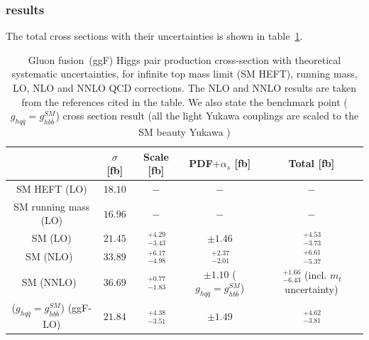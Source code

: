 \subsubsection{results}
The total cross sections with their uncertainties is shown in table~\ref{ggf_xsres}.
%
\begin{table}
	\centering
	\begin{tabular}{ccccc}
		\toprule
		& $ \sigma$	[fb] & Scale [fb] & PDF$+\alpha_s$ [fb]& Total [fb] \\
		\midrule
		SM HEFT  (LO)      &  $ 18.10$    &   $-$      & $-$   &  $-$ \\
		SM   running mass (LO)  &  $ 16.96$    &   $ -$   & $-$   &  $-$ \\
		SM    (LO)  &  $ 21.45$    &   $ \,^{+4.29}_{-3.43}$   & $\pm 1.46$   &  $ \,^{+4.53}_{-3.73}$ \\
		SM   (NLO)~\cite{Baglio:2012np}  &  $ 33.89$   &   $ \,^{+6.17}_{-4.98}$   & $ \,^{+2.37}_{-2.01}$   &  $ \,^{+6.61}_{-5.37}$ \\
		SM   (NNLO)~\cite{Grazzini:2018bsd}  &  $36.69$    &    $ \,^{+0.77}_{-1.83}$   & $\pm 1.10$    ($g_{hq \bar q} = g_{h b \bar b}^{SM}$) &  $ \,^{+1.66}_{-6.43}$ {\tiny(incl. $m_t$ uncertainty)} \\
		($g_{hq \bar q} = g_{h b \bar b}^{SM}$)  (ggF-LO)  &  $ 21.84$    &  $ \,^{+4.38}_{-3.51}$   & $\pm 1.49$   &  $ \,^{+4.62}_{-3.81}$ \\
		\bottomrule
	\end{tabular}
	\label{ggf_xsres}
	\caption{Gluon fusion~(ggF) Higgs pair production cross-section with theoretical systematic uncertainties, for infinite top mass limit (SM HEFT), running mass, LO, NLO and NNLO QCD corrections. The NLO and NNLO results are taken from the references cited in the table. We also state the benchmark point ($g_{hq \bar q} = g_{h b \bar b}^{SM}$)  cross section result (all the light Yukawa couplings are scaled to the SM beauty Yukawa )}
\end{table}